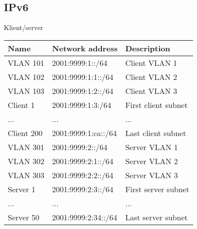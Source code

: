 \documentclass[english,master,dept460,male,cpp,cpdeclaration]{diploma}
\begin{document}
\subsection{IPv6}
\label{subsec:Sec042}
\noindent Klient/server
\begin{center}
	\begin{tabular}{l|l|l}
		Name & Network address & Description \\
		\hline
		VLAN 101 & 2001:9999:1::/64 & Client VLAN 1\\
		VLAN 102 & 2001:9999:1:1::/64 & Client VLAN 2\\
		VLAN 103 & 2001:9999:1:2::/64 & Client VLAN 3\\
		Client 1 & 2001:9999:1:3:/64 & First client subnet\\
		... & ... & ...\\
		Client 200 & 2001:9999:1:ca::/64 & Last client subnet\\
		\hline
		VLAN 301 & 2001:9999:2::/64 & Server VLAN 1\\
		VLAN 302 & 2001:9999:2:1::/64 & Server VLAN 2\\
		VLAN 303 & 2001:9999:2:2::/64 & Server VLAN 3\\
		Server 1 & 2001:9999:2:3::/64 & First server subnet\\
		... & ... & ...\\
		Server 50 & 2001:9999:2:34::/64 & Last server subnet\\
	\end{tabular}
\end{center}
\end{document}

